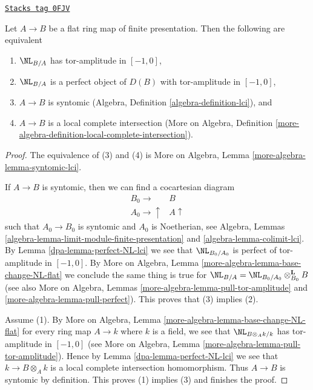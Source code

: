 \begin{lemma}
\label{dpa-lemma-flat-fp-NL-lci}
\href{https://stacks.math.columbia.edu/tag/0FJV}{\texttt{Stacks tag 0FJV}}

Let $A \to B$ be a flat ring map of finite presentation.
Then the following are equivalent
\begin{enumerate}
\item $\NL_{B/A}$ has tor-amplitude in $[-1, 0]$,
\item $\NL_{B/A}$ is a perfect object of $D(B)$
with tor-amplitude in $[-1, 0]$,
\item $A \to B$ is syntomic
(Algebra, Definition \ref{algebra-definition-lci}), and
\item $A \to B$ is a local complete intersection
(More on Algebra, Definition
\ref{more-algebra-definition-local-complete-intersection}).
\end{enumerate}
\end{lemma}

\begin{proof}

The equivalence of (3) and (4) is More on Algebra, Lemma
\ref{more-algebra-lemma-syntomic-lci}.

\medskip\noindent
If $A \to B$ is syntomic, then we can find a cocartesian diagram
$$
\begin{array}{cc}B_0 \longrightarrow & B \\ A_0 \longrightarrow\uparrow & A \uparrow\end{array}
$$
such that $A_0 \to B_0$ is syntomic and $A_0$ is Noetherian, see
Algebra, Lemmas \ref{algebra-lemma-limit-module-finite-presentation} and
\ref{algebra-lemma-colimit-lci}. By Lemma \ref{dpa-lemma-perfect-NL-lci}
we see that $\NL_{B_0/A_0}$ is perfect of tor-amplitude in $[-1, 0]$.
By More on Algebra, Lemma \ref{more-algebra-lemma-base-change-NL-flat}
we conclude the same thing is true for
$\NL_{B/A} = \NL_{B_0/A_0} \otimes_{B_0}^\mathbf{L} B$ (see
also More on Algebra, Lemmas \ref{more-algebra-lemma-pull-tor-amplitude} and
\ref{more-algebra-lemma-pull-perfect}).
This proves that (3) implies (2).

\medskip\noindent
Assume (1). By More on Algebra, Lemma
\ref{more-algebra-lemma-base-change-NL-flat}
for every ring map $A \to k$ where
$k$ is a field, we see that $\NL_{B \otimes_A k/k}$ has
tor-amplitude in $[-1, 0]$ (see
More on Algebra, Lemma \ref{more-algebra-lemma-pull-tor-amplitude}).
Hence by Lemma \ref{dpa-lemma-perfect-NL-lci} we see that $k \to B \otimes_A k$ is
a local complete intersection homomorphism. Thus $A \to B$
is syntomic by definition. This proves (1) implies (3)
and finishes the proof.
\end{proof}

